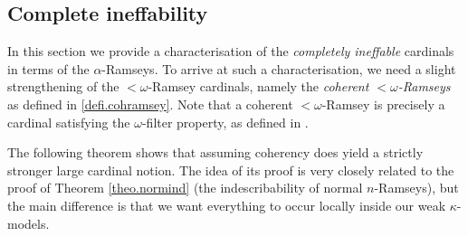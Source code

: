 \documentclass[../main]{subfiles}
\begin{document}
\subsection*{Complete ineffability}

In this section we provide a characterisation of the \textit{completely ineffable} cardinals in terms of the $\alpha$-Ramseys. To arrive at such a characterisation, we need a slight strengthening of the ${<}\omega$-Ramsey cardinals, namely the \textit{coherent ${<}\omega$-Ramseys} as defined in \ref{defi.cohramsey}. Note that a coherent ${<}\omega$-Ramsey is precisely a cardinal satisfying the $\omega$-filter property, as defined in \cite{HolySchlicht}.

\qquad The following theorem shows that assuming coherency does yield a strictly stronger large cardinal notion. The idea of its proof is very closely related to the proof of Theorem \ref{theo.normind} (the indescribability of normal $n$-Ramseys), but the main difference is that we want everything to occur locally inside our weak $\kappa$-models.
\end{document}
